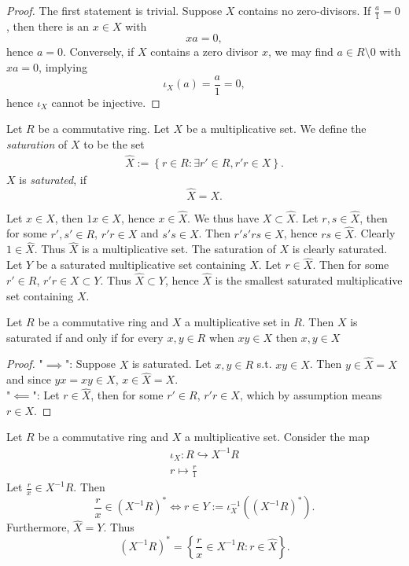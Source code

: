     \begin{proof}
        The first statement is trivial. Suppose $X$ contains no zero-divisors. If $\frac{a}{1}=0$, then there is an $x\in X$ with 
        $$
            xa= 0,
        $$
        hence $a=0$. Conversely, if $X$ contains a zero divisor $x$, we may find $a\in R\setminus 0$ with $xa = 0$, implying 
        $$
            \iota_X(a)=\frac{a}{1}=0,
        $$ 
        hence $\iota_X$ cannot be injective. 
    \end{proof}
    \begin{definition}
    Let $R$ be a commutative ring. Let $X$ be a multiplicative set. We define the \textit{saturation} of $X$ to be the set
    \begin{align*}
        \widehat{X} := \left\{ r\in R : \exists r'\in R, r'r \in X \right\}.
    \end{align*}
    $X$ is \textit{saturated}, if 
    $$\widehat{X} = X.$$
\end{definition}
\begin{remark}
    Let $x\in X$, then $1x\in X$, hence $x\in \widehat{X}$. We thus have $X\subset \widehat{X}$. Let $r,s\in \widehat{X}$, then for some $r',s'\in R$, $r'r\in X$ and $s's\in X$. Then $r's'rs\in X$, hence $rs \in \widehat{X}$. Clearly $1\in \widehat{X}$. Thus $\widehat{X}$ is a multiplicative set. The saturation of $X$ is clearly saturated. Let $Y$ be a saturated multiplicative set containing $X$. Let $r \in \widehat{X}$. Then for some $r'\in R$, $r'r\in X\subset Y$. Thus $\widehat{X}\subset Y$, hence $\widehat{X}$ is the smallest saturated multiplicative set containing $X$.
\end{remark}
\begin{lemma}\label{EquivalentDescriptionOfBeingSaturated}
    Let $R$ be a commutative ring and $X$ a multiplicative set in $R$. Then $X$ is saturated if and only if for every $x,y\in R$ when $xy \in X$ then $x,y\in X$
\end{lemma}
\begin{proof}
    "$\implies$": Suppose $X$ is saturated. Let $x,y\in R$ s.t. $xy\in X$. Then $y\in \widehat{X}=X$ and since $yx = xy \in X$, $x\in \widehat{X} = X$.\\
    "$\impliedby$": Let $r\in \widehat{X}$, then for some $r'\in R$, $r'r\in X$, which by assumption means $r\in X$. 
\end{proof}
\begin{lemma}\label{UnitsOfLocalization}
     Let $R$ be a commutative ring and $X$ a multiplicative set. Consider the map 
     \begin{gather*}
         \iota_X : R \hookrightarrow X^{-1}R\\
         r \mapsto \frac{r}{1}
     \end{gather*}
     Let $\frac{r}{x}\in X^{-1}R$. Then 
     $$\frac{r}{x}\in \left(X^{-1}R\right)^\ast \iff r \in Y:= \iota_X^{-1}\left(\left(X^{-1}R\right)^\ast\right).$$
     Furthermore, $\widehat{X} = Y$. Thus 
     $$\left( X^{-1}R \right)^\ast = \left\{ \frac{r}{x}\in X^{-1}R : r \in \widehat{X}\right\}.$$
\end{lemma}
